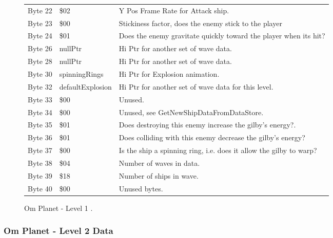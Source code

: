 \begin{figure}[H]
{\begin{adjustbox}{width=12cm}
\begin{tabular}{lll}
 Byte 22 & \$02                       & Y Pos Frame Rate for Attack ship.                                  \\
 Byte 23 & \$00                       & Stickiness factor, does the enemy stick to the player              \\
 Byte 24 & \$01                       & Does the enemy gravitate quickly toward the player when its hit?   \\
 Byte 26 & nullPtr                   & Hi Ptr for another set of wave data.                               \\
 Byte 28 & nullPtr                   & Hi Ptr for another set of wave data.                               \\
 Byte 30 & spinningRings             & Hi Ptr for Explosion animation.                                    \\
 Byte 32 & defaultExplosion          & Hi Ptr for another set of wave data for this level.                \\
 Byte 33 & \$00                       & Unused.                                                            \\
 Byte 34 & \$00                       & Unused, see GetNewShipDataFromDataStore.                           \\
 Byte 35 & \$01                       & Does destroying this enemy increase the gilby's energy?.           \\
 Byte 36 & \$01                       & Does colliding with this enemy decrease the gilby's energy?        \\
 Byte 37 & \$00                       & Is the ship a spinning ring, i.e. does it allow the gilby to warp? \\
 Byte 38 & \$04                       & Number of waves in data.                                           \\
 Byte 39 & \$18                       & Number of ships in wave.                                           \\
 Byte 40 & \$00                       & Unused bytes.                                                      \\
\bottomrule
\end{tabular}

  \end{adjustbox}

  }\caption*{Om Planet - Level 1
.}
\end{figure}

\clearpage
\subsubsection{Om Planet - Level 2 Data}

